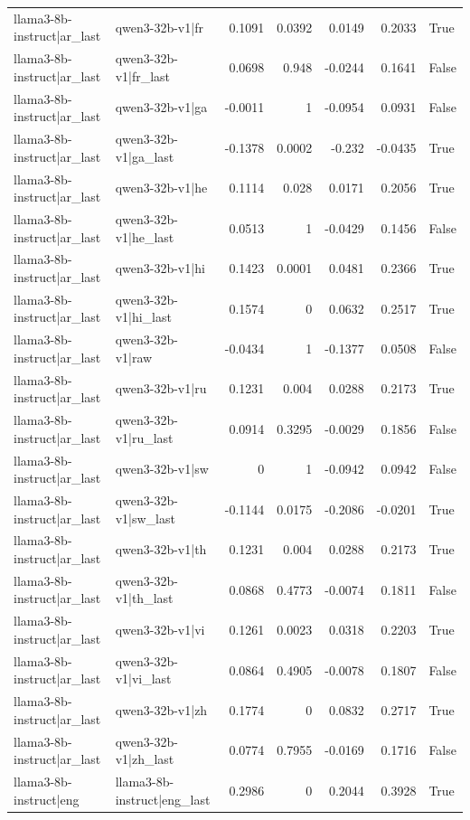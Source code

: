 \begin{table}
\begin{tabular}{l l r r r r l}
llama3-8b-instruct|ar_last & qwen3-32b-v1|fr & 0.1091 & 0.0392 & 0.0149 & 0.2033 & True \\
llama3-8b-instruct|ar_last & qwen3-32b-v1|fr_last & 0.0698 & 0.948 & -0.0244 & 0.1641 & False \\
llama3-8b-instruct|ar_last & qwen3-32b-v1|ga & -0.0011 & 1 & -0.0954 & 0.0931 & False \\
llama3-8b-instruct|ar_last & qwen3-32b-v1|ga_last & -0.1378 & 0.0002 & -0.232 & -0.0435 & True \\
llama3-8b-instruct|ar_last & qwen3-32b-v1|he & 0.1114 & 0.028 & 0.0171 & 0.2056 & True \\
llama3-8b-instruct|ar_last & qwen3-32b-v1|he_last & 0.0513 & 1 & -0.0429 & 0.1456 & False \\
llama3-8b-instruct|ar_last & qwen3-32b-v1|hi & 0.1423 & 0.0001 & 0.0481 & 0.2366 & True \\
llama3-8b-instruct|ar_last & qwen3-32b-v1|hi_last & 0.1574 & 0 & 0.0632 & 0.2517 & True \\
llama3-8b-instruct|ar_last & qwen3-32b-v1|raw & -0.0434 & 1 & -0.1377 & 0.0508 & False \\
llama3-8b-instruct|ar_last & qwen3-32b-v1|ru & 0.1231 & 0.004 & 0.0288 & 0.2173 & True \\
llama3-8b-instruct|ar_last & qwen3-32b-v1|ru_last & 0.0914 & 0.3295 & -0.0029 & 0.1856 & False \\
llama3-8b-instruct|ar_last & qwen3-32b-v1|sw & 0 & 1 & -0.0942 & 0.0942 & False \\
llama3-8b-instruct|ar_last & qwen3-32b-v1|sw_last & -0.1144 & 0.0175 & -0.2086 & -0.0201 & True \\
llama3-8b-instruct|ar_last & qwen3-32b-v1|th & 0.1231 & 0.004 & 0.0288 & 0.2173 & True \\
llama3-8b-instruct|ar_last & qwen3-32b-v1|th_last & 0.0868 & 0.4773 & -0.0074 & 0.1811 & False \\
llama3-8b-instruct|ar_last & qwen3-32b-v1|vi & 0.1261 & 0.0023 & 0.0318 & 0.2203 & True \\
llama3-8b-instruct|ar_last & qwen3-32b-v1|vi_last & 0.0864 & 0.4905 & -0.0078 & 0.1807 & False \\
llama3-8b-instruct|ar_last & qwen3-32b-v1|zh & 0.1774 & 0 & 0.0832 & 0.2717 & True \\
llama3-8b-instruct|ar_last & qwen3-32b-v1|zh_last & 0.0774 & 0.7955 & -0.0169 & 0.1716 & False \\
llama3-8b-instruct|eng & llama3-8b-instruct|eng_last & 0.2986 & 0 & 0.2044 & 0.3928 & True \\

\end{tabular}
\end{table}
